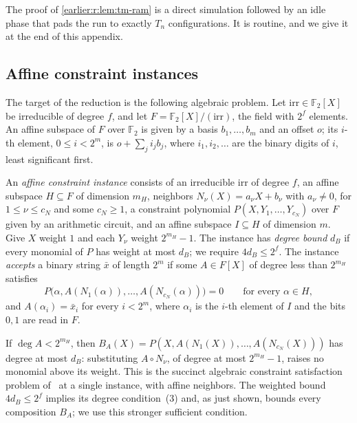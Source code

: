 The proof of \cref{earlier:r:lem:tm-ram} is a direct simulation followed by an
idle phase that pads the run to exactly \(T_n\) configurations. It is
routine, and we give it at the end of this appendix.

\subsection{Affine constraint instances}

The target of the reduction is the following algebraic problem. Let
\(\mathrm{irr}\in\mathbb F_2[X]\) be irreducible of degree \(f\), and
let \(F=\mathbb F_2[X]/(\mathrm{irr})\), the field with \(2^f\)
elements. An affine subspace of \(F\) over \(\mathbb F_2\) is given by a
basis \(b_1,\ldots,b_m\) and an offset \(o\); its \(i\)-th element,
\(0\le i<2^m\), is \(o+\sum_ji_jb_j\), where \(i_1,i_2,\ldots\) are the
binary digits of \(i\), least significant first.

\begin{definition}\label{earlier:r:def:acsp}
An \emph{affine constraint instance} consists of an irreducible
\(\mathrm{irr}\) of degree \(f\), an affine subspace \(H\subseteq F\) of
dimension \(m_H\), neighbors \(N_\nu(X)=a_\nu X+b_\nu\) with
\(a_\nu\ne0\), for \(1\le\nu\le c_N\) and some \(c_N\ge1\), a constraint
polynomial \(P(X,Y_1,\ldots,Y_{c_N})\) over \(F\) given by an arithmetic
circuit, and an affine subspace \(I\subseteq H\) of dimension \(m\).
Give \(X\) weight \(1\) and each \(Y_\nu\) weight \(2^{m_H}-1\). The
instance has \emph{degree bound} \(d_B\) if every monomial of \(P\) has
weight at most \(d_B\); we require \(4d_B\le2^f\). The instance
\emph{accepts} a binary string \(\bar x\) of length \(2^m\) if some
\(A\in F[X]\) of degree less than \(2^{m_H}\) satisfies
\[
 P\bigl(\alpha,A(N_1(\alpha)),\ldots,A(N_{c_N}(\alpha))\bigr)=0
 \qquad\text{for every }\alpha\in H,
\]
and \(A(\alpha_i)=\bar x_i\) for every \(i<2^m\), where \(\alpha_i\) is
the \(i\)-th element of \(I\) and the bits \(0,1\) are read in \(F\).
\end{definition}

If \(\deg A<2^{m_H}\), then
\(B_A(X)=P(X,A(N_1(X)),\ldots,A(N_{c_N}(X)))\) has degree at most
\(d_B\): substituting \(A\circ N_\nu\), of degree at most
\(2^{m_H}-1\), raises no monomial above its weight. This is the succinct
algebraic constraint satisfaction problem
of~\cite[Definition~7.1]{BCGT13} at a single instance, with affine
neighbors. The weighted bound \(4d_B\le2^f\) implies its degree
condition~(3) and, as just shown, bounds every composition \(B_A\); we
use this stronger sufficient condition.

